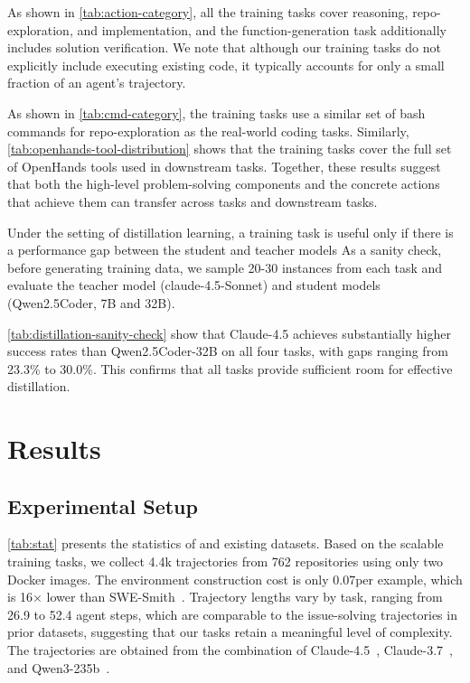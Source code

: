 As shown in \autoref{tab:action-category}, all the training tasks cover reasoning, repo-exploration, and implementation, and the function-generation task additionally includes solution verification.
We note that although our training tasks do not explicitly include executing existing code, it typically accounts for only a small fraction of an agent's trajectory.

As shown in \autoref{tab:cmd-category}, the training tasks use a similar set of bash commands for repo-exploration as the real-world coding tasks.
Similarly, \autoref{tab:openhands-tool-distribution} shows that the training tasks cover the full set of OpenHands tools used in downstream tasks.
Together, these results suggest that both the high-level problem-solving components and the concrete actions that achieve them can transfer across \hybridmethodname tasks and downstream tasks.


Under the setting of distillation learning, a training task is useful only if there is a performance gap between the student and teacher models
As a sanity check, before generating training data, we sample 20-30 instances from each task and evaluate the teacher model (claude-4.5-Sonnet) and student models (Qwen2.5Coder, 7B and 32B).

\autoref{tab:distillation-sanity-check} show that Claude-4.5 achieves substantially higher success rates than Qwen2.5Coder-32B on all four tasks, with gaps ranging from 23.3\% to 30.0\%. This confirms that all tasks provide sufficient room for effective distillation.







\section{Results}
\label{sec:exp}

\subsection{Experimental Setup}
\autoref{tab:stat} presents the statistics of \hybridmethodname and existing datasets. 
Based on the scalable training tasks, we collect 4.4k trajectories from 762 repositories using only two Docker images.
The environment construction cost is only 0.07\textcent per example, which is 16× lower than SWE-Smith~\cite{swe-smith}.
Trajectory lengths vary by task, ranging from 26.9 to 52.4 agent steps, which are comparable to the issue-solving trajectories in prior datasets, suggesting that our tasks retain a meaningful level of complexity.
The trajectories are obtained from the combination of Claude-4.5~\cite{claude45}, Claude-3.7~\cite{claude37}, and Qwen3-235b~\cite{qwen3}.


